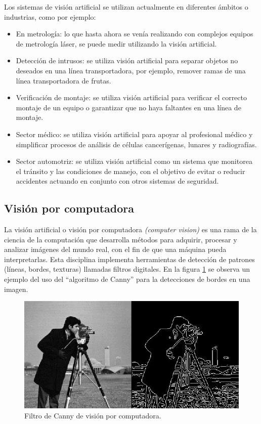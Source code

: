 
\newpage

Los sistemas de visión artificial se utilizan actualmente en diferentes ámbitos o industrias, como por ejemplo:
\begin{itemize}
\item En metrología: lo que hasta ahora se venía realizando con complejos equipos de metrología láser, se puede medir utilizando la visión artificial.
\item Detección de intrusos: se utiliza visión artificial para separar objetos no deseados en una línea transportadora, por ejemplo, remover ramas de una línea transportadora de frutas.
\item Verificación de montaje: se utiliza visión artificial para verificar el correcto montaje de un equipo o garantizar que no haya faltantes en una línea de montaje.
\item Sector médico: se utiliza visión artificial para apoyar al profesional médico y simplificar procesos de análisis de células cancerígenas, lunares y radiografías.
\item Sector automotriz: se utiliza visión artificial como un sistema que monitorea el tránsito y las condiciones de manejo, con el objetivo de evitar o reducir accidentes actuando en conjunto con otros sistemas de seguridad.
\end{itemize}

\subsection{Visión por computadora}

La visión artificial o visión por computadora \textit{(computer vision)} \citep{COMPUTER_VISION} es una rama de la ciencia de la computación que desarrolla métodos para adquirir, procesar y analizar imágenes del mundo real, con el fin de que una máquina pueda interpretarlas. Esta disciplina implementa herramientas de detección de patrones (líneas, bordes, texturas) llamadas filtros digitales. En la figura \ref{fig:visionComputadora} se observa un ejemplo del uso del ``algoritmo de Canny'' para la detecciones de bordes en una imagen.

\begin{figure}[ht]
	\centering
	\includegraphics[scale=.55]{./Figures/visionComputadora.jpg}
	\caption{Filtro de Canny de visión por computadora\protect\footnotemark.}
	\label{fig:visionComputadora}
\end{figure}


